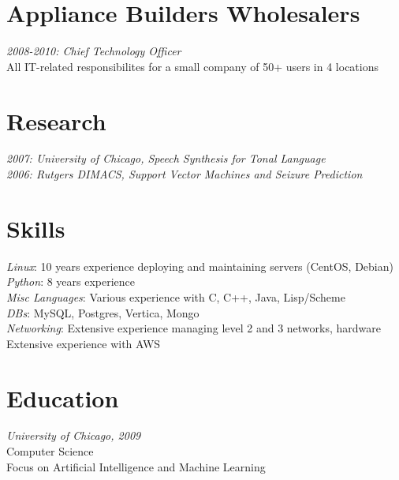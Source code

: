 \documentclass[9pt]{res} %
\begin{document}
\begin{resume}
\vspace{-2mm}
\section{Appliance Builders Wholesalers} 

{\sl 2008-2010: Chief Technology Officer} \\ 
All IT-related responsibilites for a small company of 50+ users in 4 locations

\section{Research}
{\sl 2007: University of Chicago, Speech Synthesis for Tonal Language} \\
{\sl 2006: Rutgers DIMACS, Support Vector Machines and Seizure Prediction}

\section{Skills}
{\sl Linux}: 10 years experience deploying and maintaining servers (CentOS, Debian)\\
{\sl Python}: 8 years experience \\
{\sl Misc Languages}: Various experience with C, C++, Java, Lisp/Scheme \\
{\sl DBs}: MySQL, Postgres, Vertica, Mongo \\
{\sl Networking}: Extensive experience managing level 2 and 3 networks, hardware \\
Extensive experience with AWS


\section{Education}

{\sl University of Chicago, 2009} \\
Computer Science \\
Focus on Artificial Intelligence and Machine Learning
 


\end{resume}
\end{document}
